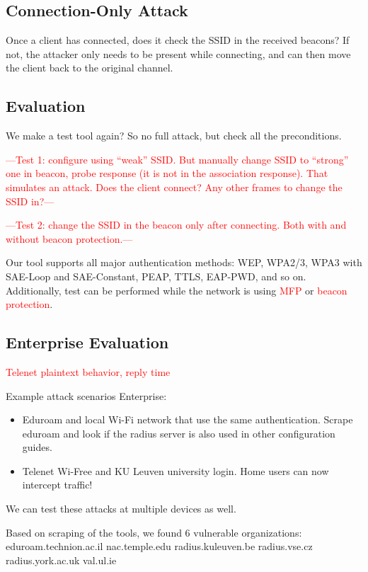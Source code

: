\documentclass[sigconf,review]{acmart}
\newcommand{\wifi}{\mbox{Wi-Fi}}
\DeclareRobustCommand{\red}[1]{\textcolor{red}{#1}}
\begin{document}
\subsection{Connection-Only Attack}

Once a client has connected, does it check the SSID in the received beacons?
If not, the attacker only needs to be present while connecting, and can then move the client back to the original channel.

\subsection{Evaluation}

We make a test tool again? So no full attack, but check all the preconditions.

\red{---Test 1: configure using ``weak'' SSID. But manually change SSID to ``strong'' one in beacon, probe response (it is not in the association response). That simulates an attack. Does the client connect? Any other frames to change the SSID in?---}

\red{---Test 2: change the SSID in the beacon only after connecting. Both with and without beacon protection.---}

Our tool supports all major authentication methods: WEP, WPA2/3, WPA3 with SAE-Loop and SAE-Constant, PEAP, TTLS, EAP-PWD, and so on.
Additionally, test can be performed while the network is using \red{MFP} or \red{beacon protection}.

\subsection{Enterprise Evaluation}

\red{Telenet plaintext behavior, reply time}

Example attack scenarios Enterprise:
\begin{itemize}
	\item Eduroam and local \wifi{} network that use the same authentication.
	Scrape eduroam and look if the radius server is also used in other configuration guides.
	\item Telenet Wi-Free and KU Leuven university login.
	Home users can now intercept traffic!
\end{itemize}

We can test these attacks at multiple devices as well.

Based on scraping of the tools, we found 6 vulnerable organizations:
eduroam.technion.ac.il
nac.temple.edu
radius.kuleuven.be
radius.vse.cz
radius.york.ac.uk
val.ul.ie
\end{document}
